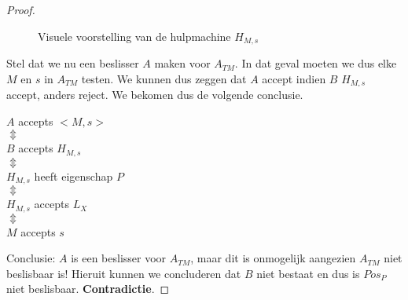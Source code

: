 \documentclass[
10pt,
a4paper,
oneside,
headinclude,footinclude, 
BCOR5mm,
]{scrartcl}
\begin{document}
\begin{proof}
\begin{figure}[h!]
\caption{Visuele voorstelling van de hulpmachine $H_{M,s}$}
\end{figure}
	Stel dat we nu een beslisser $A$ maken voor $A_{TM}$. In dat geval moeten we dus elke $M$ en $s$ in $A_{TM}$ testen. We kunnen dus zeggen dat $A$ accept indien $B$ $H_{M,s}$ accept, anders reject. We bekomen dus de volgende conclusie.
	\begin{center}
		$A$ accepts $<M,s>$\\
		$\Updownarrow$\\
		$B$ accepts $H_{M,s}$\\
		$\Updownarrow$\\
		$H_{M,s}$ heeft eigenschap $P$\\
		$\Updownarrow$\\
		$H_{M,s}$ accepts $L_X$\\
		$\Updownarrow$\\
		$M$ accepts $s$
	\end{center}
	Conclusie: $A$ is een beslisser voor $A_{TM}$, maar dit is onmogelijk aangezien $A_{TM}$ niet beslisbaar is! Hieruit kunnen we concluderen dat $B$ niet bestaat en dus is $Pos_P$ niet beslisbaar. \textbf{Contradictie}.
\end{proof}



\renewcommand{\refname}{\spacedlowsmallcaps{References}}




\end{document}
